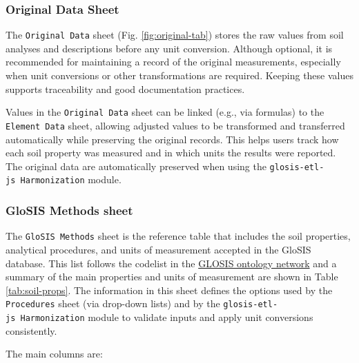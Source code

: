\documentclass[
  10pt,
  b5paper,
  oneside]{book}
\begin{document}
\subsubsection{Original Data Sheet}\label{original-data-sheet}

The \texttt{Original\ Data} sheet (Fig. \ref{fig:original-tab}) stores the raw values from soil analyses and descriptions before any unit conversion. Although optional, it is recommended for maintaining a record of the original measurements, especially when unit conversions or other transformations are required. Keeping these values supports traceability and good documentation practices.

Values in the \texttt{Original\ Data} sheet can be linked (e.g., via formulas) to the \texttt{Element\ Data} sheet, allowing adjusted values to be transformed and transferred automatically while preserving the original records. This helps users track how each soil property was measured and in which units the results were reported. The original data are automatically preserved when using the \texttt{glosis-etl-js\ Harmonization} module.

\subsubsection{GloSIS Methods sheet}\label{glosis-methods-sheet}

The \texttt{GloSIS\ Methods} sheet is the reference table that includes the soil properties, analytical procedures, and units of measurement accepted in the GloSIS database. This list follows the codelist in the \href{https://github.com/glosis-ld/glosis/blob/master/csv_codelists/glosis_procedure.csv}{GLOSIS ontology network} and a summary of the main properties and units of measurement are shown in Table \ref{tab:soil-props}. The information in this sheet defines the options used by the \texttt{Procedures} sheet (via drop-down lists) and by the \texttt{glosis-etl-js\ Harmonization} module to validate inputs and apply unit conversions consistently.

The main columns are:
\end{document}
